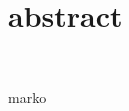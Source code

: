 \section{abstract} 
\textbf{}\\
\begin{flushleft}


\begin{itemize}

marko


	


\end{itemize} 


\end{flushleft}